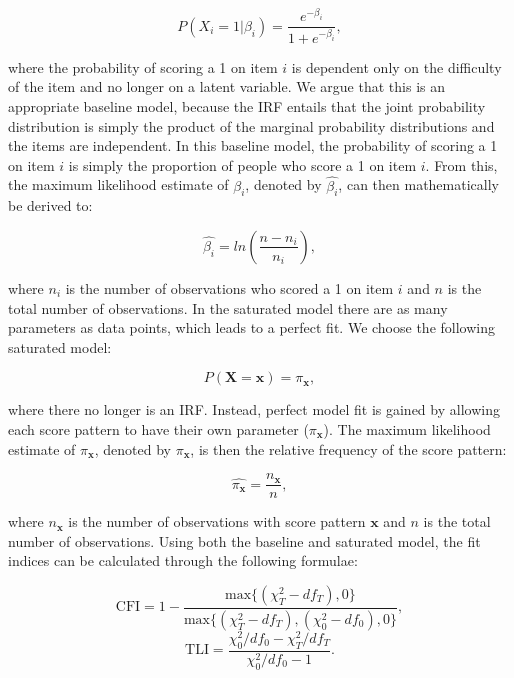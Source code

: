 \documentclass[Royal,sageapa,times,doublespace]{sagej}
\begin{document}
\begin{equation}
P(X_i = 1 | \beta_{i}) = \frac{e^{- \beta_{i}}}{1 + e^{- \beta_{i}}},
\end{equation}

where the probability of scoring a 1 on item $i$ is dependent only on the difficulty of the item and no longer on a latent variable. We argue that this is an appropriate baseline model, because the IRF entails that the joint probability distribution is simply the product of the marginal probability distributions and the items are independent. In this baseline model, the probability of scoring a 1 on item $i$ is simply the proportion of people who score a 1 on item $i$. From this, the maximum likelihood estimate of $\beta_{i}$, denoted by $\hat{\beta_{i}}$, can then mathematically be derived to:


\begin{equation*}
\hat{\beta_{i}} = ln(\frac{n - n_i}{n_i}), 
\end{equation*}

where $n_i$ is the number of observations who scored a 1 on item $i$ and $n$ is the total number of observations. In the saturated model there are as many parameters as data points, which leads to a perfect fit. We choose the following saturated model:

\begin{equation}
P(\boldsymbol{X} = \boldsymbol{x}) = \pi_{\boldsymbol{x}},
\end{equation}

where there no longer is an IRF. Instead, perfect model fit is gained by allowing each score pattern to have their own parameter ($\pi_{\boldsymbol{x}}$). The maximum likelihood estimate of $\pi_{\boldsymbol{x}}$, denoted by $\hat{\pi_{\boldsymbol{x}}}$, is then the relative frequency of the score pattern:

\begin{equation*}
\hat{\pi_{\boldsymbol{x}}} = \frac{n_{\boldsymbol{x}}}{n},
\end{equation*}

where $n_{\boldsymbol{x}}$ is the number of observations with score pattern $\boldsymbol{x}$ and $n$ is the total number of observations. Using both the baseline and saturated model, the fit indices can be calculated through the following formulae:

\begin{equation}
\text{CFI} = 1 - \frac{\text{max}\{(\chi^2_T - df_T), 0\}}{\text{max}\{(\chi^2_T - df_T), (\chi^2_0 - df_0), 0\}},
\end{equation}
\begin{equation}
\text{TLI} = \frac{\chi^2_0/df_0 - \chi^2_T/df_T}{\chi^2_0/df_0 - 1}.
\end{equation}
\end{document}
